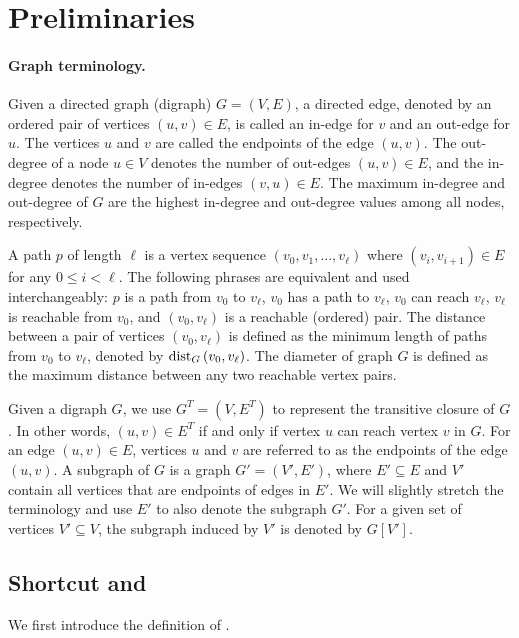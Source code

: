 \section{Preliminaries} \label{sec:prelim}

\paragraph{Graph terminology.} Given a directed graph (digraph) $G=(V,E)$, a directed edge, denoted by an ordered pair of vertices $(u,v)\in E$, is called an in-edge for $v$ and an out-edge for $u$. The vertices $u$ and $v$ are called the endpoints of the edge $(u,v)$. The out-degree of a node $u\in V$ denotes the number of out-edges $(u,v)\in E$, and the in-degree denotes the number of in-edges $(v,u)\in E$. The maximum in-degree and out-degree of $G$ are the highest in-degree and out-degree values among all nodes, respectively.

A path $p$ of length $\ell$ is a vertex sequence $(v_0,v_1,...,v_\ell)$ where $(v_i,v_{i+1})\in E$ for any $0\le i<\ell$. The following phrases are equivalent and used interchangeably: $p$ is a path from $v_0$ to $v_\ell$, $v_0$ has a path to $v_\ell$, $v_0$ can reach $v_\ell$, $v_\ell$ is reachable from $v_0$, and $(v_0,v_\ell)$ is a reachable (ordered) pair. The distance between a pair of vertices $(v_0, v_\ell)$ is defined as the minimum length of paths from $v_0$ to $v_\ell$, denoted by $\text{dist}_{G}\left(v_0,v_\ell\right)$. The diameter of graph $G$ is defined as the maximum distance between any two reachable vertex pairs.

Given a digraph $G$, we use $G^T = (V, E^T )$ to represent the transitive closure of $G$. In other words, $(u, v) \in E^T $ if and only if vertex $u$ can reach vertex $v$ in $G$. For an edge $(u, v) \in E$, vertices $u$ and $v$ are referred to as the endpoints of the edge $(u, v)$. A subgraph of $G$ is a graph $G' = (V', E')$, where $E' \subseteq E$ and $V'$ contain all vertices that are endpoints of edges in $E'$. We will slightly stretch the terminology and use $E'$ to also denote the subgraph $G'$. For a given set of vertices $V' \subseteq V$, the subgraph induced by $V'$ is denoted by $G[V']$. 

\subsection{Shortcut and \tc{}}\label{subsec:shortcut}

We first introduce the definition of \tc{}.

